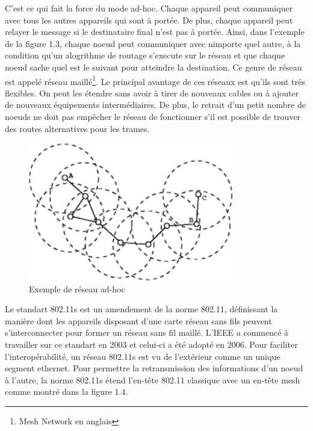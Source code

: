 C'est ce qui fait la force du mode ad-hoc. Chaque appareil peut communiquer avec tous les autres appareils qui sont à portée.
De plus, chaque appareil peut relayer le message si le destinataire final n'est pas à portée. Ainsi, dans l'exemple de
la figure 1.3, chaque noeud peut communiquer avec nimporte quel autre, à la condition qu'un alogrithme de routage s'execute
sur le réseau et que chaque noeud sache quel est le suivant pour atteindre la destination. Ce genre de réseau est appelé réseau
maillé\footnote{Mesh Network en anglais}. Le principal avantage de ces réseaux est qu'ils sont trés flexibles. On peut les étendre
sans avoir à tirer de nouveaux cables ou à ajouter de nouveaux équipements intermédiaires\cite{MNintro}. De plus, le retrait d'un
petit nombre de noeuds ne doit pas empêcher le réseau de fonctionner s'il est possible de trouver des routes alternatives pour
les trames.
\begin{figure}
   \centering
   \includegraphics[width=0.8\textwidth,natwidth=488,natheight=513]{images/ad_hoc.png}
   \caption{Exemple de réseau ad-hoc}
\end{figure}

Le standart 802.11s est un amendement de la norme 802.11, définissant la manière dont les appareils disposant d'une carte réseau
sans fils peuvent s'interconnecter pour former un réseau sans fil maillé. L'IEEE a commencé à travailler sur ce standart en 
2003 et celui-ci a été adopté en 2006. Pour faciliter l'interopérabilité, un réseau 802.11s est vu de l'extérieur comme un
unique segment ethernet. Pour permettre la retransmission des informations d'un noeud à l'autre, la norme 802.11s
étend l'en-tête 802.11 classique avec un en-tête mesh comme montré dans la figure 1.4\cite{MNfunc}.

